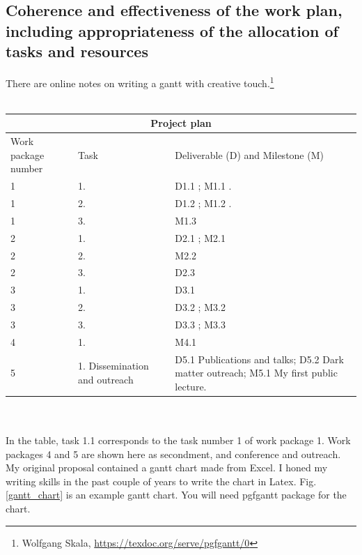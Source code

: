 \documentclass[a4paper,11pt]{extarticle}
\begin{document}
\subsection{Coherence and effectiveness of the work plan, including appropriateness of the allocation of tasks and resources}
There are online notes on writing a gantt with creative touch.\footnote{Wolfgang Skala, \href{https://texdoc.org/serve/pgfgantt/0}{https://texdoc.org/serve/pgfgantt/0}}
\\ \\
\begin{tabular}{ |p{2cm}|p{6cm}|p{6.8cm}| }
 \hline
 \multicolumn{3}{|c|}{Project plan} \\
 \hline
 Work package number & Task & Deliverable (D) and Milestone (M)\\
 \hline
 1 & 1.  & D1.1 ; M1.1 .  \\
 \hline
 1 & 2.  & D1.2 ; M1.2 .\\
 \hline
 1 & 3.  & M1.3 \\
 \hline
 2 & 1.  & D2.1 ; M2.1  \\ 
 \hline
 2 & 2.  & M2.2 \\
 \hline
 2 & 3.  & D2.3 \\
 \hline
 3 & 1.  & D3.1 \\
 \hline
 3 & 2.  & D3.2 ; M3.2 \\
 \hline
 3 & 3.  & D3.3 ; M3.3  \\
 \hline
 4 & 1.  & M4.1 \\
 \hline
 5 & 1. Dissemination and outreach & D5.1 Publications and talks; D5.2 Dark matter outreach; M5.1 My first public lecture. \\
\hline
\end{tabular}
\\ \\
In the table, task 1.1 corresponds to the task number 1 of work package 1. Work packages 4 and 5 are shown here as secondment, and conference and outreach. My original proposal contained a gantt chart made from Excel. I honed my writing skills in the past couple of years to write the chart in Latex. Fig. \ref{gantt_chart} is an example gantt chart. You will need pgfgantt package for the chart.
\end{document}
